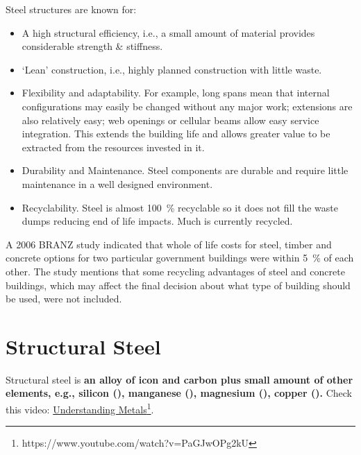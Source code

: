 Steel structures are known for:
\begin{itemize}
\item A high structural efficiency, i.e., a small amount of material provides considerable strength \& stiffness.
\item `Lean' construction, i.e., highly planned construction with little waste.
\item Flexibility and adaptability. For example, long spans mean that internal configurations may easily be changed without any major work; extensions are also relatively easy; web openings or cellular beams allow easy service integration. This extends the building life and allows greater value to be extracted from the resources invested in it.
\item Durability and Maintenance. Steel components are durable and require little maintenance in a well designed environment.
\item Recyclability. Steel is almost \si{100\percent} recyclable so it does not fill the waste dumps reducing end of life impacts. Much is currently recycled.
\end{itemize}

A 2006 BRANZ study indicated that whole of life costs for steel, timber and concrete options for two particular government buildings were within \SI{5}{\percent} of each other. The study mentions that some recycling advantages of steel and concrete buildings, which may affect the final decision about what type of building should be used, were not included.
\section{Structural Steel}
Structural steel is \textbf{an alloy of icon and carbon plus small amount of other elements, e.g., silicon (), manganese (), magnesium (), copper ().} Check this video: \href{https://www.youtube.com/watch?v=PaGJwOPg2kU}{Understanding Metals}\footnote{https://www.youtube.com/watch?v=PaGJwOPg2kU}.

